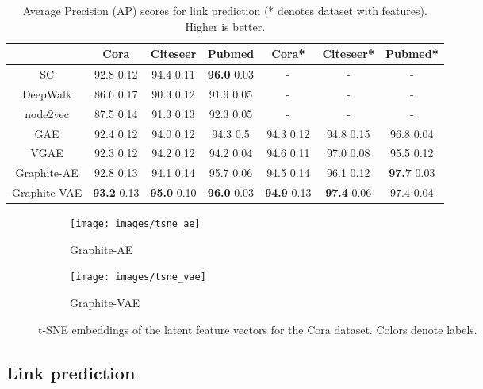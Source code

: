 \documentclass{article}
\newcommand{\name}{Graphite}
\begin{document}
\normalsize
\begin{table*}[t]
  \caption{Average Precision (AP) scores for link prediction (* denotes dataset with features). Higher is better.}
  \label{table-ap}
  \centering
   \vspace{0.05in}
  \begin{tabular}{|c|c|c|c|c|c|c|}
    \toprule
	& Cora & Citeseer & Pubmed & Cora* & Citeseer* & Pubmed* \\
    \midrule
    SC & 92.8  0.12 & 94.4  0.11& \textbf{96.0}  0.03 & - & - & -\\
    DeepWalk & 86.6  0.17& 90.3  0.12& 91.9  0.05& - & - & -\\
    node2vec & 87.5  0.14& 91.3  0.13& 92.3  0.05 & - & - & -\\
    GAE & 92.4  0.12& 94.0  0.12& 94.3  0.5& 94.3  0.12& 94.8  0.15& 96.8  0.04\\
    VGAE & 92.3  0.12& 94.2  0.12& 94.2  0.04& 94.6  0.11& 97.0  0.08& 95.5  0.12\\
    \midrule
\name-AE & 92.8  0.13& 94.1  0.14& 95.7  0.06& 94.5  0.14& 96.1  0.12& \textbf{97.7}  0.03 \\
\name-VAE & \textbf{93.2}  0.13 & \textbf{95.0}  0.10 & \textbf{96.0}  0.03 & \textbf{94.9}  0.13 & \textbf{97.4}  0.06 & 97.4  0.04\\

    \bottomrule
  \end{tabular}
\end{table*}

\normalsize

\begin{figure}[ht]
\centering
\begin{subfigure}[b]{0.45\textwidth}
\centering
\texttt{[image: images/tsne\_ae]}
\caption{Graphite-AE}
\end{subfigure}
\begin{subfigure}[b]{0.45\textwidth}
\centering
\texttt{[image: images/tsne\_vae]}
\caption{Graphite-VAE}
\end{subfigure}
\caption{t-SNE embeddings of the latent feature vectors for the Cora dataset. Colors denote labels.}\label{fig:tsne_clustering} 
\vspace{-0.05in}
\end{figure}


\subsection{Link prediction}
\end{document}
